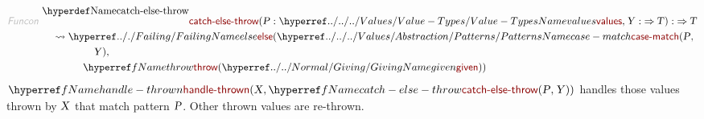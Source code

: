 \begin{align*}
  \KEY{Funcon} ~ 
  & \NAMEDECL{catch-else-throw}(\VAR{P} : \NAMEHYPER{../../../Values}{Value-Types}{values}, \VAR{Y} :  \TO \VAR{T}) :  \TO \VAR{T} \\
  & \quad \leadsto \NAMEHYPER{../.}{Failing}{else}
                     ( \NAMEHYPER{../../../Values/Abstraction}{Patterns}{case-match}
                         ( \VAR{P}, \\&\quad \quad \quad \quad \quad 
                           \VAR{Y} ), \\&\quad \quad \quad \quad 
                       \NAMEREF{throw}
                         ( \NAMEHYPER{../../Normal}{Giving}{given} ) )
\end{align*}
$\SHADE{\NAMEREF{handle-thrown}
           ( \VAR{X},   
             \NAMEREF{catch-else-throw}
               ( \VAR{P},    
                 \VAR{Y} ) )}$ handles those values thrown by $\SHADE{\VAR{X}}$
   that match pattern $\SHADE{\VAR{P}}$.  Other thrown values are re-thrown.

